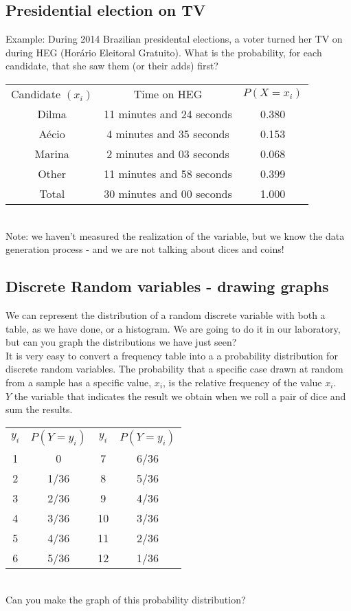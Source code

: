 \documentclass[11pt]{article}
\begin{document}
	\subsection*{Presidential election on TV}
	
	Example: During 2014 Brazilian presidental elections, a voter turned her TV on during HEG (Horário Eleitoral Gratuito). What is the probability, for each candidate, that she saw them (or their adds) first?\\
	
	\begin{tabular}{|c|c|c|}
\hline
	Candidate $(x_i)$ & Time on HEG & $P(X=x_i)$\\
	\cline{1-3}
	Dilma & 11 minutes and 24 seconds  & 0.380\\
	Aécio & 4 minutes and 35 seconds & 0.153\\
	Marina & 2 minutes and 03 seconds & 0.068\\
	Other & 11 minutes and 58 seconds & 0.399\\
	\cline{1-3}
	Total & 30 minutes and 00 seconds & 1.000\\
\hline
\end{tabular}\\

Note: we haven't measured the realization of the variable, but we know the data generation process - and we are not talking about dices and coins!

	\subsection*{Discrete Random variables - drawing graphs}
	
	We can represent the distribution of a random discrete variable with both a table, as we have done, or a histogram. We are going to do it in our laboratory, but can you graph the distributions we have just seen?\\

	It is very easy to convert a frequency table into a a probability distribution for discrete random variables. The probability that a specific case drawn at random from a sample has a specific value, $x_i$, is the relative frequency of the value $x_i$.\\

	$Y$ the variable that indicates the result we obtain when we roll a pair of dice and sum the results.\newline\\
	\begin{tabular}{|c|c|c|c|}
\hline
	$y_i$ & $P(Y=y_i)$ & $y_i$ & $P(Y=y_i)$\\
	\cline{1-4}
	1 & 0 & 7 & 6/36\\
	2 & 1/36 & 8 & 5/36\\
	3 & 2/36 & 9 & 4/36\\
	4 & 3/36 & 10 & 3/36\\
	5 & 4/36 & 11 & 2/36\\
	6 & 5/36 & 12 & 1/36\\
\hline
\end{tabular}
\newline\\
Can you make the graph of this probability distribution?
\end{document}
